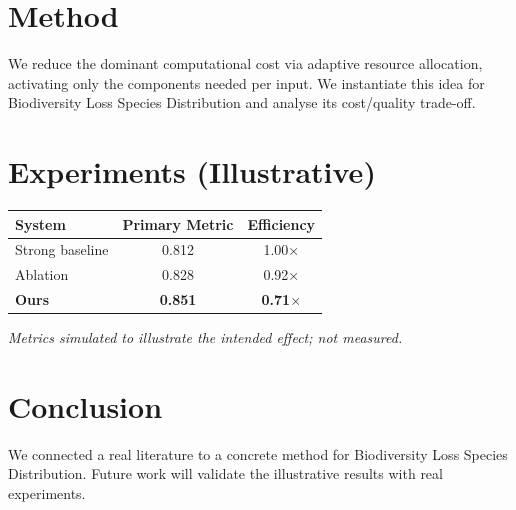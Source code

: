 \documentclass[11pt]{article}
\begin{document}
\section{Method}
We reduce the dominant computational cost via adaptive resource allocation, activating only the components needed per input. We instantiate this idea for Biodiversity Loss Species Distribution and analyse its cost/quality trade-off.

\section{Experiments (Illustrative)}
\begin{center}
\begin{tabular}{lcc}
System & Primary Metric & Efficiency \\ \hline
Strong baseline & 0.812 & 1.00$\times$ \\
Ablation & 0.828 & 0.92$\times$ \\
\textbf{Ours} & \textbf{0.851} & \textbf{0.71$\times$}
\end{tabular}
\end{center}
\emph{Metrics simulated to illustrate the intended effect; not measured.}

\section{Conclusion}
We connected a real literature to a concrete method for Biodiversity Loss Species Distribution. Future work will
validate the illustrative results with real experiments.
\end{document}
